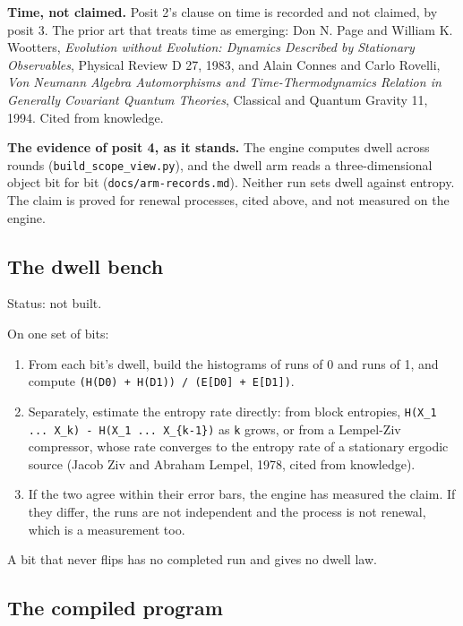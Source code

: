 \textbf{Time, not claimed.} Posit 2's clause on time is recorded and not claimed, by posit 3. The prior art that treats time as emerging: Don N. Page and William K. Wootters, \emph{Evolution without Evolution: Dynamics Described by Stationary Observables}, Physical Review D 27, 1983, and Alain Connes and Carlo Rovelli, \emph{Von Neumann Algebra Automorphisms and Time-Thermodynamics Relation in Generally Covariant Quantum Theories}, Classical and Quantum Gravity 11, 1994. Cited from knowledge.

\textbf{The evidence of posit 4, as it stands.} The engine computes dwell across rounds (\texttt{build\_\allowbreak{}scope\_\allowbreak{}view.\allowbreak{}py}), and the dwell arm reads a three-dimensional object bit for bit (\texttt{docs/\allowbreak{}arm-\allowbreak{}records.\allowbreak{}md}). Neither run sets dwell against entropy. The claim is proved for renewal processes, cited above, and not measured on the engine.

\subsection{\texorpdfstring{The dwell bench}{The dwell bench}}

Status: not built.

On one set of bits:

\begin{enumerate}
\item From each bit's dwell, build the histograms of runs of 0 and runs of 1, and compute \texttt{(H(D0) + H(D1)) /\allowbreak{} (E[D0] + E[D1])}.
\item Separately, estimate the entropy rate directly: from block entropies, \texttt{H(X\_\allowbreak{}1 .\allowbreak{}.\allowbreak{}.\allowbreak{} X\_\allowbreak{}k) -\allowbreak{} H(X\_\allowbreak{}1 .\allowbreak{}.\allowbreak{}.\allowbreak{} X\_\allowbreak{}\{k-\allowbreak{}1\})} as \texttt{k} grows, or from a Lempel-Ziv compressor, whose rate converges to the entropy rate of a stationary ergodic source (Jacob Ziv and Abraham Lempel, 1978, cited from knowledge).
\item If the two agree within their error bars, the engine has measured the claim. If they differ, the runs are not independent and the process is not renewal, which is a measurement too.
\end{enumerate}

A bit that never flips has no completed run and gives no dwell law.

\subsection{\texorpdfstring{The compiled program}{The compiled program}}

